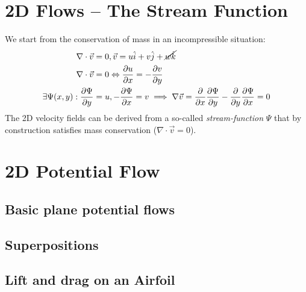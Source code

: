 \section{2D Flows -- The Stream Function}
We start from the conservation of mass in an incompressible situation:
\begin{equation*}
	\begin{split}
		\nabla \cdot \vec v &= 0, \vec v = u\hat i + v\hat j + \cancel{w\hat k}\\
		\nabla \cdot \vec v &= 0 \Leftrightarrow \frac{\partial u}{\partial x} = - \frac{\partial v }{\partial y}\\
		\exists \Psi(x,y) :  \frac{\partial \Psi}{\partial y} &= u, -\frac{\partial \Psi}{\partial x} = v\implies \nabla \vec v = \frac{\partial}{\partial x}\frac{\partial \Psi}{\partial y} - \frac{\partial}{\partial y} \frac{\partial \Psi}{\partial x} = 0
	\end{split}
\end{equation*}
The 2D velocity fields can be derived from a so-called \textit{stream-function} $\Psi$ that by construction satisfies mass conservation ($\nabla \cdot \vec v = 0$).



\section{2D Potential Flow}

\subsection{Basic plane potential flows}
\subsection{Superpositions}
\subsection{Lift and drag on an Airfoil}